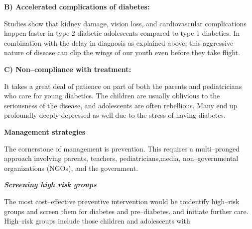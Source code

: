\noindent\textbf{B) Accelerated complications of diabetes:}

Studies show that kidney damage, vision loss, and cardiovascular complications happen faster in type 2 diabetic adolescents compared to type 1 diabetics. In combination with the delay in diagnosis as explained above, this aggressive nature of disease can clip the wings of our youth even before they take flight.

\noindent\textbf{C) Non–compliance with treatment:}

It takes a great deal of patience on part of both the parents and pediatricians who care for young diabetics. The children are usually oblivious to the seriousness of the disease, and adolescents are often rebellious. Many end up profoundly deeply depressed as well due to the stress of having diabetes.


\noindent\textbf{Management strategies}

The cornerstone of management is prevention. This requires a multi–pronged approach involving parents, teachers, pediatricians,\break media, non–governmental organizations (NGOs), and the government.

\noindent\textbf{\textit{Screening high risk groups}}

The most cost–effective preventive intervention would be to\break identify high–risk groups and screen them for diabetes and pre–dia\-betes, and initiate further care. High–risk groups include those children and adolescents with

